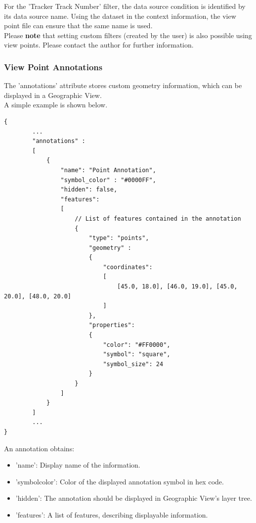 For the 'Tracker Track Number' filter, the data source condition is identified by its data source name. Using the dataset in the context information, the view point file can ensure that the same name is used. \\

Please \textbf{note} that setting custom filters (created by the user) is also possible using view points. Please contact the author for further information.

\subsubsection{View Point Annotations}

The 'annotations' attribute stores custom geometry information, which can be displayed in a Geographic View. \\

A simple example is shown below.

\begin{lstlisting}[basicstyle=\small\ttfamily]
{
        ...
        "annotations" :
        [
            {
                "name": "Point Annotation", 
                "symbol_color" : "#0000FF",
                "hidden": false,
                "features":
                [
                    // List of features contained in the annotation 
                    {
                        "type": "points",
                        "geometry" :
                        {
                            "coordinates": 
                            [
                                [45.0, 18.0], [46.0, 19.0], [45.0, 20.0], [48.0, 20.0]
                            ]
                        },
                        "properties":
                        {
                            "color": "#FF0000",
                            "symbol": "square",
                            "symbol_size": 24
                        }
                    }    
                ]
            }
        ]
        ...
}
\end{lstlisting}

An annotation obtains: \\

\begin{itemize}
    \item 'name': Display name of the information.
    \item 'symbol\textunderscore color': Color of the displayed annotation symbol in hex code.
    \item 'hidden': The annotation should be displayed in Geographic View's layer tree.
    \item 'features': A list of features, describing displayable information. \\
\end{itemize}

